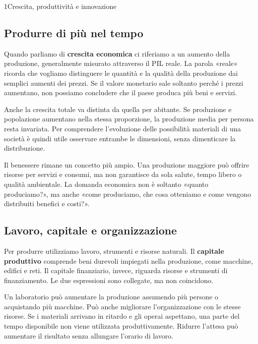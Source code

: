 
\begin{lettura}{1}{Crescita, produttività e innovazione}


\subsection*{Produrre di più nel tempo}
Quando parliamo di \textbf{crescita economica} ci riferiamo a un aumento della produzione, generalmente misurato attraverso il PIL reale. La parola «reale» ricorda che vogliamo distinguere le quantità e la qualità della produzione dai semplici aumenti dei prezzi. Se il valore monetario sale soltanto perché i prezzi aumentano, non possiamo concludere che il paese produca più beni e servizi.

Anche la crescita totale va distinta da quella per abitante. Se produzione e popolazione aumentano nella stessa proporzione, la produzione media per persona resta invariata. Per comprendere l'evoluzione delle possibilità materiali di una società è quindi utile osservare entrambe le dimensioni, senza dimenticare la distribuzione.

Il benessere rimane un concetto più ampio. Una produzione maggiore può offrire risorse per servizi e consumi, ma non garantisce da sola salute, tempo libero o qualità ambientale. La domanda economica non è soltanto «quanto produciamo?», ma anche «come produciamo, che cosa otteniamo e come vengono distribuiti benefici e costi?».

\subsection*{Lavoro, capitale e organizzazione}
Per produrre utilizziamo lavoro, strumenti e risorse naturali. Il \textbf{capitale produttivo} comprende beni durevoli impiegati nella produzione, come macchine, edifici e reti. Il capitale finanziario, invece, riguarda risorse e strumenti di finanziamento. Le due espressioni sono collegate, ma non coincidono.

Un laboratorio può aumentare la produzione assumendo più persone o acquistando più macchine. Può anche migliorare l'organizzazione con le stesse risorse. Se i materiali arrivano in ritardo e gli operai aspettano, una parte del tempo disponibile non viene utilizzata produttivamente. Ridurre l'attesa può aumentare il risultato senza allungare l'orario di lavoro.


\end{lettura}
